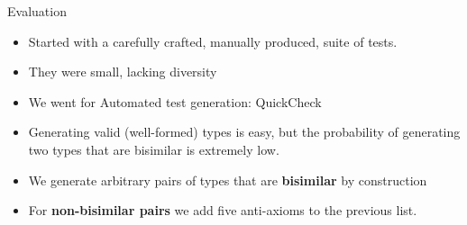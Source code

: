 \documentclass[10pt]{beamer}
\begin{document}
\begin{frame}{Evaluation}
  \begin{itemize}
  \item Started with a carefully crafted, manually produced, suite of tests.
  \smallskip
  \item They were small, lacking diversity
  \smallskip
  \item We went for Automated test generation: QuickCheck
  \smallskip
  \item Generating valid (well-formed) types is easy, but the probability of
    generating two types that are bisimilar is extremely low.
    \smallskip
  \item We generate arbitrary pairs of types that are \textbf{bisimilar}
    by construction %
    \smallskip
  \item For \textbf{non-bisimilar pairs} we add five anti-axioms to the previous list.
  \end{itemize}
     
\end{frame}

  

\end{document}
